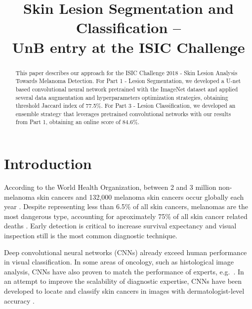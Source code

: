 \documentclass[conference]{IEEEtran}
\begin{document}
\title{Skin Lesion Segmentation and Classification --\\
  UnB entry at the ISIC Challenge}

\author{
}

\maketitle


\begin{abstract}
  This paper describes our approach for the ISIC Challenge 2018 - Skin Lesion Analysis Towards Melanoma Detection. For Part 1 - Lesion Segmentation, we developed a U-net based convolutional neural network pretrained with the ImageNet dataset and applied several data augmentation and hyperparameters optimization strategies, obtaining threshold Jaccard index of 77.5\%. For Part 3 - Lesion Classification, we developed an ensemble strategy that leverages pretrained convolutional networks with our results from Part 1, obtaining an online score of 84.6\%. 
\end{abstract}

\section{Introduction}

According to the World Health Organization, between 2 and 3 million non-melanoma skin cancers and 132,000 melanoma skin cancers occur globally each year \cite{who}. Despite representing less than 6.5\% of all skin cancers, melanomas are the most dangerous type, accounting for aproximately 75\% of all skin cancer related deaths \cite{who,nature}.
Early detection is critical to increase survival expectancy and visual inspection still is the most common diagnostic technique.

Deep convolutional neural networks (CNNs) already exceed human performance in visual classification\cite{fei}.
In some areas of oncology, such as histological image analysis, CNNs have also proven to match the performance of experts, e.g.\ \cite{veta_etal_mia2015}.
In an attempt to improve the scalability of diagnostic expertise, CNNs have been developed to locate and classify skin cancers in images with dermatologist-level accuracy \cite{nature}.
\end{document}
